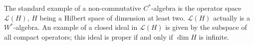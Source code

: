 The standard example of a non-commutative $C^*$-algebra is the operator space $\mathcal{L}(H)$, $H$ being a Hilbert space of dimension at least two. $\mathcal{L}(H)$ actually is a $W^*$-algebra. An example of a closed ideal in $\mathcal{L}(H)$ is given by the subspace of all compact operators; this ideal is proper if and only if $\dim H$ is infinite.
